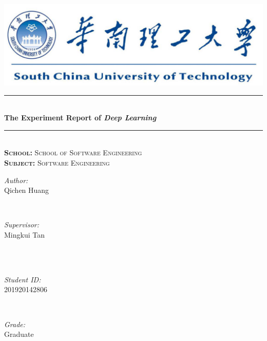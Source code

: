 \documentclass[journal, a4paper]{IEEEtran}
\begin{document}
\begin{titlepage}

\newcommand{\HRule}{\rule{\linewidth}{0.5mm}} %

\center 
~\\[1cm]
\includegraphics{SCUT.png}\\[2cm] 
\HRule \\[1cm]
{ \huge \bfseries The Experiment Report of \textit{Deep Learning} }\\[0.6cm] %
\HRule \\[2cm]

\textsc{\LARGE \textbf{School:} School of Software Engineering}\\[1cm]
\textsc{\LARGE \textbf{Subject:} Software Engineering}\\[2cm]

\begin{minipage}{0.4\textwidth}
\begin{flushleft} \large
\emph{Author:}\\
Qichen Huang %
\end{flushleft}
\end{minipage}
~
\begin{minipage}{0.4\textwidth}
\begin{flushright} \large
\emph{Supervisor:} \\
Mingkui Tan%
\end{flushright}
\end{minipage}\\[2cm]
~
\begin{minipage}{0.4\textwidth}
\begin{flushleft} \large
\emph{Student ID:}\\
201920142806
\end{flushleft}
\end{minipage}
~
\begin{minipage}{0.4\textwidth}
\begin{flushright} \large
\emph{Grade:} \\
Graduate
\end{flushright}
\end{minipage}\\[2cm]


\end{titlepage}
\end{document}
